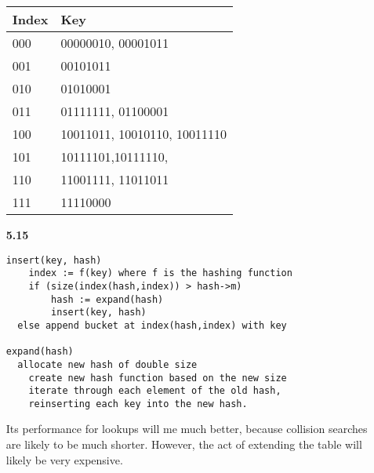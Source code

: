\documentclass{article}
\begin{document}
\begin{enumerate}
	\begin{tabular}[t]{l | l}
	\textbf{Index} & \textbf{Key} \\ \hline
	000 & 00000010, 00001011 \\
	001 & 00101011 \\
	010 & 01010001 \\
	011 & 01111111, 01100001 \\
	100 &  10011011,  10010110, 10011110 \\
	101 & 10111101,10111110, \\
	110 & 11001111, 11011011 \\
	111 & 11110000 
	\end{tabular}
\item[\textbf{5.15}]

\begin{verbatim}
insert(key, hash)
	index := f(key) where f is the hashing function
	if (size(index(hash,index)) > hash->m)
		hash := expand(hash)
		insert(key, hash)
  else append bucket at index(hash,index) with key

expand(hash)
  allocate new hash of double size
	create new hash function based on the new size
	iterate through each element of the old hash,
	reinserting each key into the new hash.

\end{verbatim}

Its performance for lookups will me much better, because collision searches are
likely to be much shorter. However, the act of extending the table will likely
be very expensive.

\end{enumerate}
\end{document}
